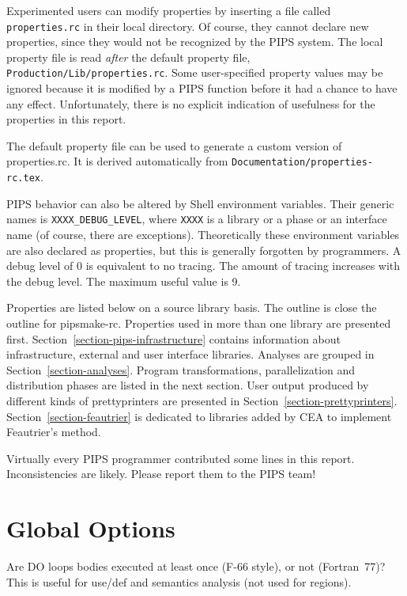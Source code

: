 Experimented users can modify properties by inserting a file called
\verb+properties.rc+ in their local directory. Of course, they cannot
declare new properties, since they would not be recognized by the PIPS
system. The local property file is read {\em after} the default property
file, \verb+Production/Lib/properties.rc+. Some user-specified property
values may be ignored because it is modified by a PIPS function before
it had a chance to have any effect. Unfortunately, there is no explicit
indication of usefulness for the properties in this report.

The default property file can be used to generate a custom version of
properties.rc. It is derived automatically from
\verb+Documentation/properties-rc.tex+.

PIPS behavior can also be altered by Shell environment variables. Their
generic names is \verb+XXXX_DEBUG_LEVEL+, where \verb+XXXX+ is a library
or a phase or an interface name (of course, there are
exceptions). Theoretically these environment variables are also declared
as properties, but this is generally forgotten by programmers. A debug
level of 0 is equivalent to no tracing. The amount of tracing increases
with the debug level. The maximum useful value is 9.

Properties are listed below on a source library basis. The outline is
close the outline for pipsmake-rc\cite{}.  Properties used in more than
one library are presented
first. Section~\ref{section-pips-infrastructure} contains information
about infrastructure, external and user interface libraries. Analyses
are grouped in Section~\ref{section-analyses}. Program transformations,
parallelization and distribution phases are listed in the next
section. User output produced by different kinds of prettyprinters are
presented in
Section~\ref{section-prettyprinters}. Section~\ref{section-feautrier} is
dedicated to libraries added by CEA to implement Feautrier's method.

Virtually every PIPS programmer contributed some lines in this
report. Inconsistencies are likely. Please report them to the PIPS team!

\section{Global Options}

Are DO loops bodies executed at least once (F-66 style), or not (Fortran~77)?
This is useful for use/def and semantics analysis (not used for regions).

